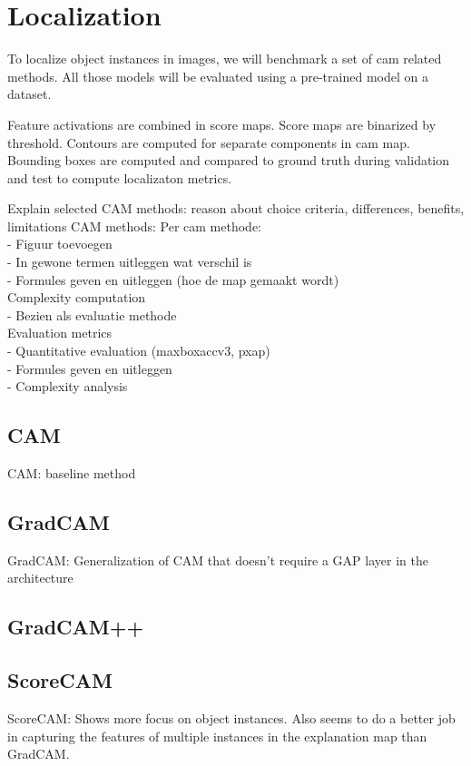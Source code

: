 \section{Localization}
To localize object instances in images, we will benchmark a set of \acrshort{cam} related methods. All those models will be evaluated using a pre-trained model on a dataset. 

 Feature activations are combined in score maps. Score maps are binarized by threshold. Contours are computed for separate components in cam map. Bounding boxes are computed and compared to ground truth during validation and test to compute localizaton metrics.

Explain selected CAM methods: reason about choice criteria, differences, benefits, limitations
CAM methods: Per cam methode: \\
- Figuur toevoegen \\
- In gewone termen uitleggen wat verschil is \\
- Formules geven en uitleggen (hoe de map gemaakt wordt) \\
Complexity computation \\
- Bezien als evaluatie methode \\
Evaluation metrics \\
- Quantitative evaluation (maxboxaccv3, pxap) \\
- Formules geven en uitleggen \\
- Complexity analysis \\

\subsection{CAM}
CAM: baseline method

\subsection{GradCAM}
GradCAM: Generalization of CAM that doesn’t require a GAP layer in the architecture

\subsection{GradCAM++}

\subsection{ScoreCAM}
ScoreCAM: Shows more focus on object instances. Also seems to do a better job in capturing the features of multiple instances in the explanation map than GradCAM.

